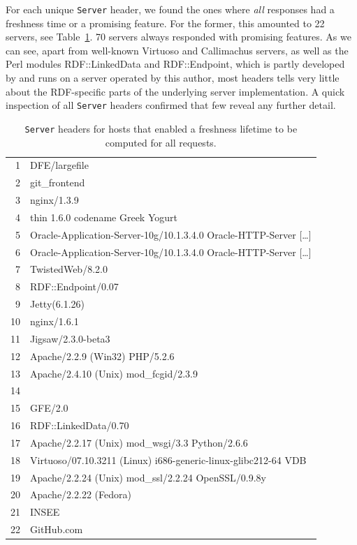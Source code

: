 \documentclass{llncs}
\newcommand{\httph}[1]{\texttt{#1}}
\begin{document}
For each unique \httph{Server} header, we found the ones where
\emph{all} responses had a freshness time or a promising feature. For
the former, this amounted to 22 servers, see 
Table~\ref{tab:servers}. 70 servers always responded with promising
features. As we can see, apart from well-known Virtuoso and
Callimachus servers, as well as the Perl modules RDF::LinkedData and
RDF::Endpoint, which is partly developed by and runs on a server
operated by this author, most headers tells very little about the
RDF-specific parts of the underlying server implementation. A quick
inspection of all \httph{Server} headers confirmed that few reveal any
further detail.

\begin{table}[ht]
  \caption{\httph{Server} headers for hosts that enabled a freshness
    lifetime to be computed for all requests.}\label{tab:servers}
\begin{center}
\begin{tabular}{rl}
  \hline
1 & DFE/largefile \\ 
  2 & git\_frontend \\ 
  3 & nginx/1.3.9 \\ 
  4 & thin 1.6.0 codename Greek Yogurt \\ 
  5 & Oracle-Application-Server-10g/10.1.3.4.0 Oracle-HTTP-Server [\ldots]\\
  6 & Oracle-Application-Server-10g/10.1.3.4.0 Oracle-HTTP-Server [\ldots]\\
  7 & TwistedWeb/8.2.0 \\ 
  8 & RDF::Endpoint/0.07 \\ 
  9 & Jetty(6.1.26) \\ 
  10 & nginx/1.6.1 \\ 
  11 & Jigsaw/2.3.0-beta3 \\ 
  12 & Apache/2.2.9 (Win32) PHP/5.2.6 \\ 
  13 & Apache/2.4.10 (Unix) mod\_fcgid/2.3.9 \\ 
  14 &  \\ 
  15 & GFE/2.0 \\ 
  16 & RDF::LinkedData/0.70 \\ 
  17 & Apache/2.2.17 (Unix) mod\_wsgi/3.3 Python/2.6.6 \\ 
  18 & Virtuoso/07.10.3211 (Linux) i686-generic-linux-glibc212-64  VDB \\ 
  19 & Apache/2.2.24 (Unix) mod\_ssl/2.2.24 OpenSSL/0.9.8y \\ 
  20 & Apache/2.2.22 (Fedora) \\ 
  21 & INSEE \\ 
  22 & GitHub.com \\ 
   \hline
\end{tabular}
\end{center}
\end{table}
\end{document}
